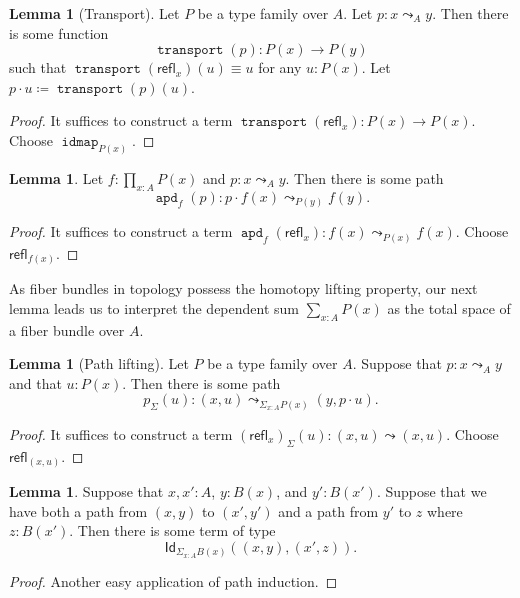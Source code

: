 \documentclass[10pt,letterpaper,cm]{nupset}
\theoremstyle{definition}
\theoremstyle{theorem}
\newtheorem{lemma}[definition]{Lemma}
\theoremstyle{remark}
\newcommand{\id}{\mathsf{Id}}
\newcommand{\refl}{\mathsf{refl}}
\newcommand{\0}{\mathbf{0}}
\newcommand{\1}{\mathbf{1}}
\newcommand{\2}{\mathbf{2}}
\DeclareMathOperator{\idmap}{\mathtt{idmap}}
\DeclareMathOperator{\transport}{\mathtt{transport}}
\DeclareMathOperator{\apd}{\mathtt{apd}}
\begin{document}
\smallskip

\begin{lemma}[Transport]
Let $P$ be a type family over $A$. Let $p: x\leadsto_A y$. Then there is some function $$\transport(p) : P(x) \to P(y)$$ such that $\transport(\refl_x)(u) \equiv u$ for any $u: P(x)$. Let $p \cdot u \coloneqq \transport(p)(u)$.
\end{lemma}
\begin{proof}
It suffices to construct a term $ \transport(\refl_x)  : P(x) \to P(x)  .$ Choose $\idmap_{P(x)}$.
\end{proof}

\begin{lemma}
Let $f: \prod_{x:A}P(x)$ and $p: x\leadsto_A y$. Then there is some path $$\apd_f(p):p \cdot f(x) \leadsto_{P(y)} f(y).$$
\end{lemma}
\begin{proof}
It suffices to construct a term $ \apd_f(\refl_x) : f(x) \leadsto_{P(x)}f(x)    .$ Choose $\refl_{f(x)}$.
\end{proof}

As fiber bundles in topology possess the homotopy lifting property,  our next lemma leads us to interpret the dependent sum $\sum_{x:A}P(x)$ as the total space of a fiber bundle over $A$.

\begin{lemma}[Path lifting]
Let $P$ be a type family over $A$. Suppose that $p: x\leadsto_A y$ and that $u: P(x)$. Then there is some path $$p_{\Sigma}(u) : \left(x, u\right) \leadsto_{\Sigma_{x:A}P(x)} \left(y, p\cdot u\right).$$
\end{lemma}
\begin{proof}
It suffices to construct a term $\left(\refl_x\right)_{\Sigma}(u) : (x, u) \leadsto (x, u)$. Choose $\refl_{(x,u)}$.
\end{proof}



\begin{lemma}\label{noname1}
Suppose that $x, x':A$, $y :B(x)$, and $y' : B(x')$. Suppose that we have both a path from $\left(x,y\right)$ to $\left(x', y'\right)$ and a path from $y'$ to $z$ where $z: B(x')$. Then there is some term of type $$\id_{\Sigma_{x:A} B(x)}\left(\left(x,y\right), \left(x',z\right)\right).$$
\end{lemma}
\begin{proof}
Another easy application of path induction. 
\end{proof}

\medskip
\end{document}
